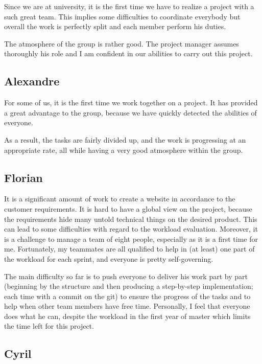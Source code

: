 Since we are at university, it is the first time we have to realize a
project with a such great team. This implies some difficulties to
coordinate everybody but overall the work is perfectly split and each
member perform his duties. \newline

The atmosphere of the group is rather good. The project manager assumes
thoroughly his role and I am confident in our abilities to carry out this
project.

\subsection{Alexandre}

For some of us, it is the first time we work together on a project. It has
provided a great advantage to the group, because we have quickly detected
the abilities of everyone. \newline

As a result, the tasks are fairly divided up, and the work is progressing
at an appropriate rate, all while having a very good atmosphere within the
group.

\subsection{Florian}

It is a significant amount of work to create a website in accordance to the
customer requirements. It is hard to have a global view on the project,
because the requirements hide many untold technical things on the desired
product. This can lead to some difficulties with regard to the workload
evaluation. Moreover, it is a challenge to manage a team of eight people,
especially as it is a first time for me. Fortunately, my
teammates are all qualified to help in (at least) one part of the workload for
each sprint, and everyone is pretty self-governing. \newline

The main difficulty so far is to push everyone to deliver his work part by
part (beginning by the structure and then producing a step-by-step
implementation; each time with a commit on the git) to ensure the progress
of the tasks and to help when other team members have free time.
Personally, I feel that everyone does what he can, despite the workload in
the first year of master which limits the time left for this project.\newline
\subsection{Cyril}

